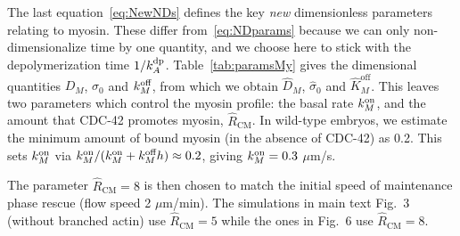 \documentclass[11pt]{article}
\newcommand{\6}[1]{#1_{\text{6}}}
\newcommand{\3}[1]{#1_{\text{3}}}
\begin{document}
The last equation\ \eqref{eq:NewNDs} defines the key \emph{new} dimensionless parameters relating to myosin. These differ from\ \eqref{eq:NDparams} because we can only non-dimensionalize time by one quantity, and we choose here to stick with the depolymerization time $1/k^\text{dp}_A$. Table\ \ref{tab:paramsMy} gives the dimensional quantities $D_M$, ${\sigma}_0$ and $k^\text{off}_M$, from which we obtain $\hat D_M$, $\hat \sigma_0$ and $\hat K^\text{off}_M$. This leaves two parameters which control the myosin profile: the basal rate $k^\text{on}_M$, and the amount that CDC-42 promotes myosin, $\hat R_\text{CM}$. In wild-type embryos, we estimate the minimum amount of bound myosin (in the absence of CDC-42) as 0.2. This sets $k^\text{on}_M$ via $k^\text{on}_M/(k^\text{on}_M+k^\text{off}_M h) \approx 0.2$, giving $k^\text{on}_M=0.3$ $\mu$m/s. 

The parameter $\hat R_\text{CM}=8$ is then chosen to match the initial speed of maintenance phase rescue (flow speed 2 $\mu$m/min). The simulations in main text Fig.\ 3 (without branched actin) use $\hat R_\text{CM}=5$ while the ones in Fig.\ 6 use $\hat R_\text{CM}=8$. 
\end{document}
